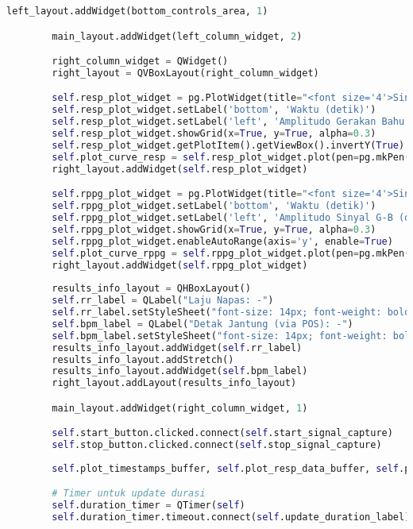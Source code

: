 \documentclass[11pt,a4paper]{article}
\begin{document}
\begin{lstlisting}[language=Python, caption=Kelas RealTimeSignalWorker,label={labelkode}]
        left_layout.addWidget(bottom_controls_area, 1)

        main_layout.addWidget(left_column_widget, 2) 

        right_column_widget = QWidget()
        right_layout = QVBoxLayout(right_column_widget)

        self.resp_plot_widget = pg.PlotWidget(title="<font size='4'>Sinyal Pernapasan (RR)</font>")
        self.resp_plot_widget.setLabel('bottom', 'Waktu (detik)')
        self.resp_plot_widget.setLabel('left', 'Amplitudo Gerakan Bahu (px)')
        self.resp_plot_widget.showGrid(x=True, y=True, alpha=0.3)
        self.resp_plot_widget.getPlotItem().getViewBox().invertY(True) 
        self.plot_curve_resp = self.resp_plot_widget.plot(pen=pg.mkPen('#00FFFF', width=2)) 
        right_layout.addWidget(self.resp_plot_widget)

        self.rppg_plot_widget = pg.PlotWidget(title="<font size='4'>Sinyal Detak Jantung (rPPG)</font>")
        self.rppg_plot_widget.setLabel('bottom', 'Waktu (detik)')
        self.rppg_plot_widget.setLabel('left', 'Amplitudo Sinyal G-B (dinormalisasi)') 
        self.rppg_plot_widget.showGrid(x=True, y=True, alpha=0.3)
        self.rppg_plot_widget.enableAutoRange(axis='y', enable=True) 
        self.plot_curve_rppg = self.rppg_plot_widget.plot(pen=pg.mkPen('#39FF14', width=2)) 
        right_layout.addWidget(self.rppg_plot_widget)
        
        results_info_layout = QHBoxLayout()
        self.rr_label = QLabel("Laju Napas: -")
        self.rr_label.setStyleSheet("font-size: 14px; font-weight: bold;")
        self.bpm_label = QLabel("Detak Jantung (via POS): -") 
        self.bpm_label.setStyleSheet("font-size: 14px; font-weight: bold;")
        results_info_layout.addWidget(self.rr_label)
        results_info_layout.addStretch()
        results_info_layout.addWidget(self.bpm_label)
        right_layout.addLayout(results_info_layout)

        main_layout.addWidget(right_column_widget, 1) 

        self.start_button.clicked.connect(self.start_signal_capture)
        self.stop_button.clicked.connect(self.stop_signal_capture)
        
        self.plot_timestamps_buffer, self.plot_resp_data_buffer, self.plot_rppg_data_buffer = [], [], []

        # Timer untuk update durasi
        self.duration_timer = QTimer(self)
        self.duration_timer.timeout.connect(self.update_duration_label)


\end{lstlisting}
\end{document}
